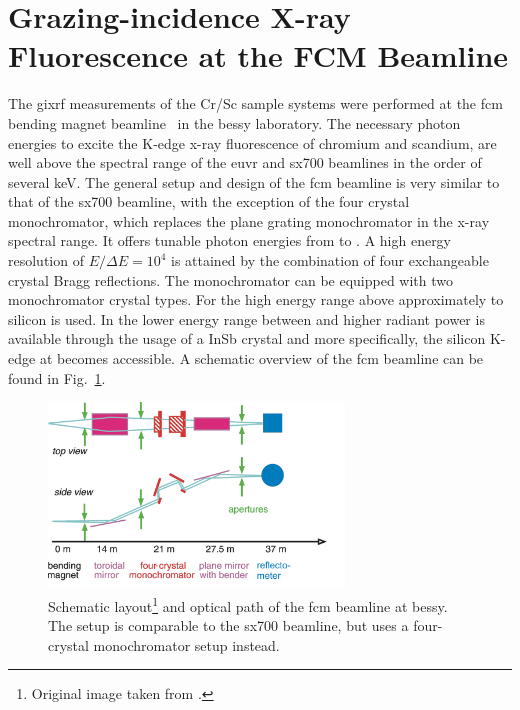 \section{Grazing-incidence X-ray Fluorescence at the FCM Beamline} \label{ch_exp:sec_xrf_at_fcm}
The \gls{gixrf} measurements of the Cr/Sc sample systems were performed at the \gls{fcm} bending magnet beamline~\cite{krumrey_design_1998} in the \gls{bessy} laboratory. The necessary photon energies to excite the K-edge x-ray fluorescence of chromium and scandium, are well above the spectral range of the \gls{euvr} and \gls{sx700} beamlines in the order of several \si{\kilo\electronvolt}. The general setup and design of the \gls{fcm} beamline is very similar to that of the \gls{sx700} beamline, with the exception of the four crystal monochromator, which replaces the plane grating monochromator in the x-ray spectral range. It offers tunable photon energies from  to . A high energy resolution of $E/\Delta E = 10^4$ is attained by the combination of four exchangeable crystal Bragg reflections. The monochromator can be equipped with two monochromator crystal types. For the high energy range above approximately  to  silicon is used. In the lower energy range between  and  higher radiant power is available through the usage of a InSb crystal and more specifically, the silicon K-edge at  becomes accessible. A schematic overview of the \gls{fcm} beamline can be found in Fig.~\ref{ch_exp:fig_fcm_scheme}.
\begin{figure}[htb]
        \includegraphics[width=0.7\textwidth]{img/FCMScheme.png}
        \caption[FCM beamline scheme.]{%
            Schematic layout\footnote{Original image taken from \textcite{krumrey_design_1998}.} and optical path of the \gls{fcm} beamline at \gls{bessy}. The setup is comparable to the \gls{sx700} beamline, but uses a four-crystal monochromator setup instead.}
        \label{ch_exp:fig_fcm_scheme}
\end{figure}

